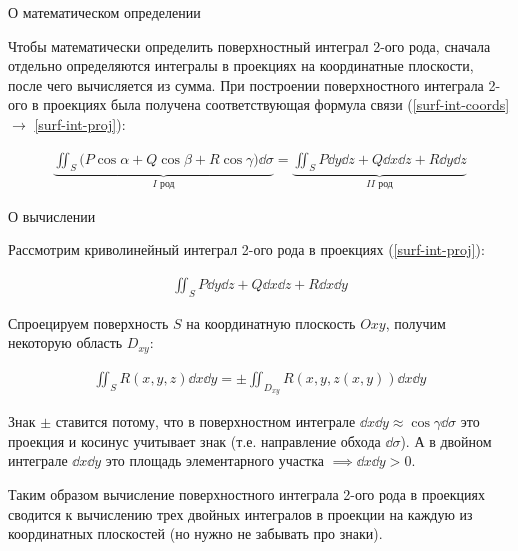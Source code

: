 
\begin{remark}
  О математическом определении

  Чтобы математически определить поверхностный интеграл 2-ого рода, сначала
  отдельно определяются интегралы в проекциях на координатные плоскости, после
  чего вычисляется из сумма. При построении поверхностного интеграла 2-ого в
  проекциях была получена соответствующая формула связи
  (\ref{surf-int-coords} \(\to\) \ref{surf-int-proj}):

  \begin{align*}
    \underbrace{\iint_{S} \Big(
      P \cos \alpha +
      Q \cos \beta +
      R \cos \gamma\Big
    ) \dd \sigma}_{I \text{ род}} =
    \underbrace{\iint_{S}
      P \dd y \dd z +
      Q \dd x \dd z +
      R \dd y \dd z
    }_{II \text{ род}}
  \end{align*}
\end{remark}

\begin{remark}
  О вычислении

  Рассмотрим криволинейный интеграл 2-ого рода в проекциях
  (\ref{surf-int-proj}):

  \begin{align*}
    \iint_{S} P \dd y \dd z + Q \dd x \dd z + R \dd x \dd y  
  \end{align*}

  Спроецируем поверхность \(S\) на координатную плоскость \(Oxy\), получим
  некоторую область \(D_{xy}\):

  \begin{align*}
    \iint_{S} R(x, y, z) \dd x \dd y
    = \pm \iint_{D_{xy}} R(x, y, z(x, y)) \dd x \dd y
  \end{align*}

  Знак \(\pm\) ставится потому, что в поверхностном интеграле
  \(\dd x \dd y \approx \cos \gamma \dd \sigma\) это проекция и косинус
  учитывает знак (т.е. направление обхода \(\dd \sigma\)). А в двойном интеграле
  \(\dd x \dd y\) это площадь элементарного участка
  \(\implies \dd x \dd y > 0\).

  Таким образом вычисление поверхностного интеграла 2-ого рода в проекциях
  сводится к вычислению трех двойных интегралов в проекции на каждую из
  координатных плоскостей (но нужно не забывать про знаки).
\end{remark}
